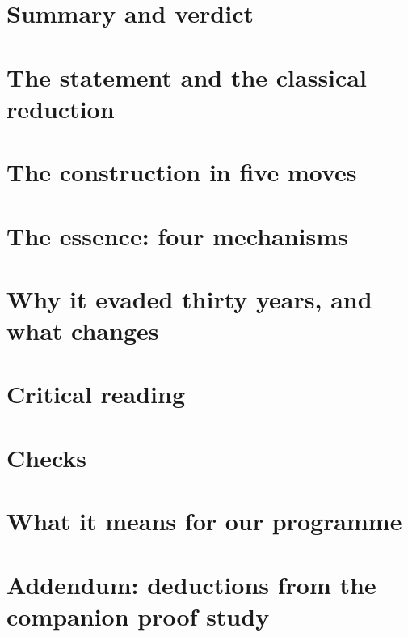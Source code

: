 \documentclass[11pt]{article}
\theoremstyle{plain}
\theoremstyle{definition}\newtheorem{definition}[theorem]{Definition}\newtheorem{remark}[theorem]{Remark}
\newcommand{\F}{\mathbb F}\newcommand{\Ad}{\operatorname{Ad}}\renewcommand{\arg}{\operatorname{arg}}
\begin{document}
\begin{abstract}
\emph{Addendum} (Section~\ref{sec:deductions}). We confirm the companion study's deductions and sharpen them:
\begin{itemize}[leftmargin=*]
\item a relative absorption $P*L(\Z)\cong P*L(\F_{k+1})$ fixing $P$;
\item weak nullness of the discarded completions, which form a free Haar unitary in $M^\omega$;
\item a hard-edge steering law, $\|T_mh-\delta_e\|\,\|h\|\ge(1+o(1))/(2\sqrt m)$, which forces $m=\Theta(\varepsilon^{-4})$ on the paper's route against the
universal $2/\varepsilon-1$;
\item the Fox flows as cocycle self-conjugacies of the free Bernoulli shift $M=(*_\Gamma L(\Z))\rtimes\Gamma$.
\end{itemize}
\end{abstract}
\tableofcontents
\section{Summary and verdict}

\section{The statement and the classical reduction}

\section{The construction in five moves}

\section{The essence: four mechanisms}

\section{Why it evaded thirty years, and what changes}

\section{Critical reading}

\section{Checks}

\section{What it means for our programme}

\section{Addendum: deductions from the companion proof study}

\end{document}
